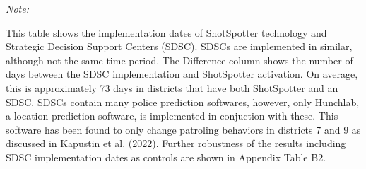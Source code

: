 \begin{table}[H]
\begin{threeparttable}
\begin{tablenotes}
\item \textit{Note: } 
\item This table shows                      the implementation dates of ShotSpotter technology and                      Strategic Decision Support Centers (SDSC). SDSCs are implemented                      in similar, although not the same time period.                      The Difference column shows the number of days between                      the SDSC implementation and ShotSpotter activation. On                      average, this is approximately                      73 days in districts that have both ShotSpotter and an SDSC. SDSCs contain many police prediction softwares, however,                      only Hunchlab, a location prediction software,                      is implemented in conjuction with these. This software has been                      found to only change patroling behaviors in                      districts 7 and 9 as discussed in Kapustin et al. (2022). Further                      robustness of the results including SDSC implementation dates                      as controls are shown in Appendix Table B2.
\end{tablenotes}
\end{threeparttable}
\end{table}
